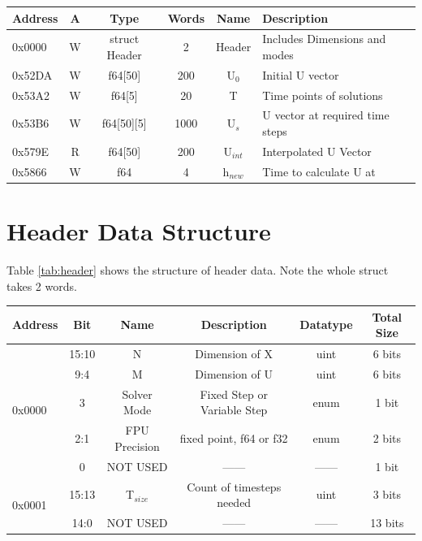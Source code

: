 \documentclass[12pt]{report}
\begin{document}
\begin{center}
 \begin{tabular}{||l |c| c| c| c| l||} 
 \hline
 Address & A & Type & Words & Name & Description  \\ [0.5ex] 
 \hline\hline
  0x0000 & W & struct Header & 2 & Header & Includes Dimensions and modes  \\ 
  \hline
  0x52DA  & W & f64[50] & 200 & U$_0$ & Initial U vector \\
 \hline
 0x53A2  & W & f64[5] & 20 & T & Time points of solutions  \\
 \hline
 0x53B6  & W & f64[50][5] & 1000 & U$_s$ & U vector at required time steps \\
 \hline
 0x579E  & R & f64[50] & 200 & U$_{int}$ & Interpolated U Vector \\
 \hline
 0x5866  & W & f64 & 4 & h$_{new}$ & Time to calculate U at \\
 \hline
\end{tabular}
\end{center}

\section{Header Data Structure}
Table \ref{tab:header} shows the structure of header data. Note the whole struct takes 2 words.
\begin{center}
 \begin{tabular}{||l |c |c| c| c| c||} 
 \hline
 Address & Bit & Name & Description & Datatype & Total Size \\ [0.5ex] 
 \hline\hline
 \multirow{5}{*}{0x0000} & 15:10 & N & Dimension of X  & uint & 6 bits  \\ 
 \cline{2-6}
 & 9:4 & M & Dimension of U  & uint & 6 bits  \\ 
 \cline{2-6}
 & 3 & Solver Mode & Fixed Step or Variable Step  & enum & 1 bit \\ 
 \cline{2-6}
 & 2:1 & FPU Precision & fixed point, f64 or f32 & enum & 2 bits  \\ 
 \cline{2-6}
 & 0  & NOT USED &  ------ & ------ & 1 bit \\
 \hline
 \multirow{2}{*}{0x0001} & 15:13 & T$_{size}$ & Count of timesteps needed & uint & 3 bits \\ 
 \cline{2-6}
 & 14:0 & NOT USED &  ------ & ------ & 13 bits \\
 \hline
\end{tabular}
\end{center}
\end{document}
